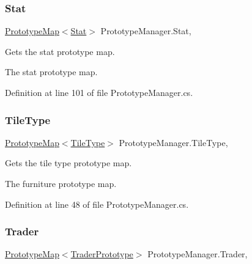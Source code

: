 \subsubsection{\texorpdfstring{Stat}{Stat}}
{\footnotesize\ttfamily \hyperlink{class_prototype_map}{Prototype\+Map}$<$\hyperlink{class_project_porcupine_1_1_entities_1_1_stat}{Stat}$>$ Prototype\+Manager.\+Stat\hspace{0.3cm}{\ttfamily [static]}, {\ttfamily [get]}}



Gets the stat prototype map. 

The stat prototype map.

Definition at line 101 of file Prototype\+Manager.\+cs.

\mbox{\label{class_prototype_manager_a881412466a625880a9d352a44d88269a}} 
\subsubsection{\texorpdfstring{Tile\+Type}{TileType}}
{\footnotesize\ttfamily \hyperlink{class_prototype_map}{Prototype\+Map}$<$\hyperlink{class_tile_type}{Tile\+Type}$>$ Prototype\+Manager.\+Tile\+Type\hspace{0.3cm}{\ttfamily [static]}, {\ttfamily [get]}}



Gets the tile type prototype map. 

The furniture prototype map.

Definition at line 48 of file Prototype\+Manager.\+cs.

\mbox{\label{class_prototype_manager_aa72bd66f68e462dbfeb89729a7d04d9e}} 
\subsubsection{\texorpdfstring{Trader}{Trader}}
{\footnotesize\ttfamily \hyperlink{class_prototype_map}{Prototype\+Map}$<$\hyperlink{class_trader_prototype}{Trader\+Prototype}$>$ Prototype\+Manager.\+Trader\hspace{0.3cm}{\ttfamily [static]}, {\ttfamily [get]}}



